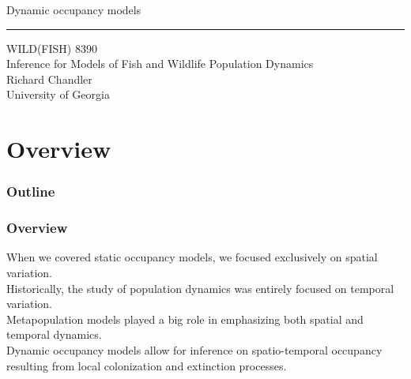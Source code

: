\documentclass[color=usenames,dvipsnames,handout]{beamer}\usepackage[]{graphicx}\usepackage[]{xcolor}
\begin{document}
\begin{frame}[plain]
  \LARGE
  \centering
  {\huge %
    Dynamic occupancy models} \\
  {\color{default} \rule{\textwidth}{0.1pt}}
  \vfill
  \large
  WILD(FISH) 8390 \\
  Inference for Models of Fish and Wildlife Population Dynamics \\
  \vfill
  Richard Chandler \\
  University of Georgia \\
\end{frame}






\section{Overview}



\begin{frame}[plain]
  \frametitle{Outline}
  \Large
\end{frame}



\begin{frame}
  \frametitle{Overview}
  When we covered static occupancy models, we focused exclusively on
  spatial variation. \\   
  \pause
  \vfill
  Historically, the study of population dynamics was entirely
  focused on temporal variation. \\
  \pause
  \vfill
  Metapopulation models played a big role in emphasizing both spatial
  and temporal dynamics. \\
  \pause
  \vfill
  Dynamic occupancy models allow for inference on spatio-temporal
  occupancy resulting from local colonization and extinction
  processes. \\
\end{frame}
\end{document}
